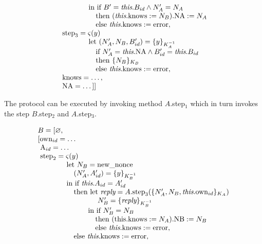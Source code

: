 \documentclass[10pt, conference, compsocconf]{IEEEtran}
\newcommand{\symb}[1]{\makebox{\it #1}}
\begin{document}
{\begin{small}
\[\begin{array}{l}
    \qquad \qquad \text{in}\ \text{if}\ B' = \symb{this}.B_{id} \wedge N_A'=N_A\ \\
    \qquad \qquad\quad \text{then}\ (\symb{this}.\text{knows} := N_B).\text{NA} := N_A\\
    \qquad \qquad\quad \text{else}\ \symb{this}.\text{knows} :=  \text{error},\\
  \ \text{step}_3 = \varsigma(y)\\
    \qquad\qquad \text{let}\ (N_A', N_B, B_{id}') = \{y\}_{K_A^{-1}}\\
    \qquad\qquad\quad  \text{if}\ N_A' = \symb{this}.\text{NA} \wedge B_{id}' = \symb{this}.B_{id}\ \\
    \qquad\qquad\quad \text{then}\ \{N_B\}_{K_B}\\
    \qquad\qquad\quad \text{else}\ \symb{this}.\text{knows} := \text{error},\\
  \ \text{knows} = \ldots, \\
  \ \text{NA} = \dots ]]
\end{array}
\]
\end{small}
The protocol can be executed by invoking method $A.$step$_1$ which in turn invokes
the step $B.$step$_2$ and $A.$step$_3$.
\begin{small}
\[
\begin{array}{l}
B = [\varnothing, \\
\left[ \text{own}_{id} = \dots \right. \\
\ \text{A}_{id} = \dots \\    
\ \text{step}_2 = \varsigma(y) \\
    \qquad \qquad \text{let}\ N_B = \text{new\_nonce}\\
    \qquad \qquad\quad (N_A', A_{id}') = \{y\}_{K_B^{-1}}\\
    \qquad \qquad \text{in}\ \text{if}\ \symb{this}.A_{id} = A_{id}'\\ 
    \qquad \qquad\quad \text{then}\ \text{let}\ \symb{reply} = A.\text{step}_3(\{N_A',N_B,\symb{this}.\text{own}_{id}\}_{K_A})\\
    \qquad \qquad\qquad\qquad\ N_B' = \{\symb{reply}\}_{K_B^{-1}}\\
    \qquad \qquad\qquad\quad \text{in}\ \text{if}\ N_B' = N_B \\
    \qquad \qquad\qquad\qquad \text{then}\ (\text{this}.\text{knows} := N_A).\text{NB} := N_B\\
    \qquad \qquad\qquad\qquad \text{else}\ \symb{this}.\text{knows} :=  \text{error},\\
    \qquad \qquad\quad \text{else}\ \symb{this}.\text{knows} :=  \text{error},\\

\end{array}\]
\end{small}}
\end{document}
